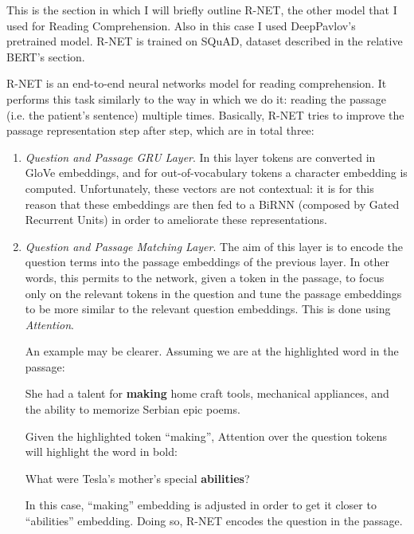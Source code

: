 This is the section in which I will briefly outline R-NET, the other model that I used for Reading Comprehension. Also in this case I used DeepPavlov's pretrained model. R-NET is trained on SQuAD, dataset described in the relative BERT's section.

R-NET is an end-to-end neural networks model for reading comprehension. It performs this task similarly to the way in which we do it: reading the passage (i.e. the patient's sentence) multiple times. Basically, R-NET tries to improve the passage representation step after step, which are in total three:
\begin{enumerate}
  \item \textit{Question and Passage GRU Layer}. In this layer tokens are converted in GloVe embeddings, and for out-of-vocabulary tokens a character embedding is computed. Unfortunately, these vectors are not contextual: it is for this reason that these embeddings are then fed to a BiRNN (composed by Gated Recurrent Units) in order to ameliorate these representations.
  \item \textit{Question and Passage Matching Layer}. The aim of this layer is to encode the question terms into the passage embeddings of the previous layer. In other words, this permits to the network, given a token in the passage, to focus only on the relevant tokens in the question and tune the passage embeddings to be more similar to the relevant question embeddings. This is done using \textit{Attention}.
  
An example may be clearer. Assuming we are at the highlighted word in the passage:

\begin{displayquote}
She had a talent for \textbf{making} home craft tools, mechanical appliances, and the ability to memorize Serbian epic poems.
\end{displayquote}

Given the highlighted token ``making'', Attention over the question tokens will highlight the word in bold:

\begin{displayquote}
What were Tesla's mother's special \textbf{abilities}?
\end{displayquote}

In this case, ``making'' embedding is adjusted in order to get it closer to ``abilities'' embedding. Doing so, R-NET encodes the question in the passage.


\end{enumerate}

